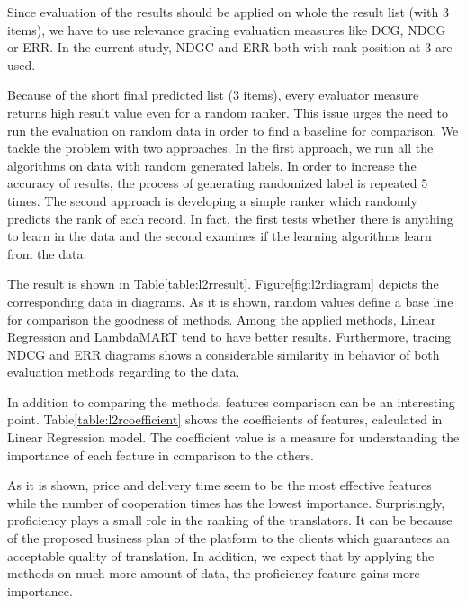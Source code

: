 Since evaluation of the results should be applied on whole the result list (with $3$ items), we have to use relevance grading evaluation measures like DCG, NDCG or ERR. In the current study, NDGC and ERR both with rank position at $3$ are used.

Because of the short final predicted list ($3$ items), every evaluator measure returns high result value even for a random ranker. This issue urges the need to run the evaluation on random data in order to find a baseline for comparison. We tackle the problem with two approaches. In the first approach, we run all the algorithms on data with random generated labels. In order to increase the accuracy of results, the process of generating randomized label is repeated $5$ times. The second approach is developing a simple ranker which randomly predicts the rank of each record. In fact, the first tests whether there is anything to learn in the data and the second examines if the learning algorithms learn from the data.

The result is shown in Table\ref{table:l2rresult}.  Figure\ref{fig:l2rdiagram} depicts the corresponding data in diagrams. As it is shown, random values define a base line for comparison the goodness of methods. Among the applied methods, Linear Regression and LambdaMART tend to have better results. Furthermore, tracing NDCG and ERR diagrams shows a considerable similarity in behavior of both evaluation methods regarding to the data.

In addition to comparing the methods, features comparison can be an interesting point. Table\ref{table:l2rcoefficient} shows the coefficients of features, calculated in Linear Regression model. The coefficient value is a measure for understanding the importance of each feature in comparison to the others. 

As it is shown, price and delivery time seem to be the most effective features while the number of cooperation times has the lowest importance. Surprisingly, proficiency plays a small role in the ranking of the translators. It can be because of the proposed business plan of the platform to the clients which guarantees an acceptable quality of translation. In addition, we expect that by applying the methods on much more amount of data, the proficiency feature gains more importance.

